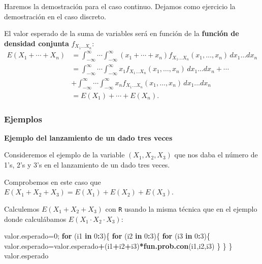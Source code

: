 \documentclass[]{book}
\newenvironment{Shaded}{\begin{snugshade}}{\end{snugshade}}
\newcommand{\ControlFlowTok}[1]{\textcolor[rgb]{0.13,0.29,0.53}{\textbf{#1}}}
\newcommand{\DecValTok}[1]{\textcolor[rgb]{0.00,0.00,0.81}{#1}}
\newcommand{\KeywordTok}[1]{\textcolor[rgb]{0.13,0.29,0.53}{\textbf{#1}}}
\newcommand{\NormalTok}[1]{#1}
\newcommand{\OperatorTok}[1]{\textcolor[rgb]{0.81,0.36,0.00}{\textbf{#1}}}
\begin{document}
Haremos la demostración para el caso continuo. Dejamos como ejercicio la demostración en el caso discreto.

El valor esperado de la suma de variables será en función de la \textbf{función de densidad conjunta} \(f_{X_1\ldots X_n}\):
\[
\begin{array}{rl}
E(X_1+\cdots + X_n) & = \int_{-\infty}^\infty\cdots\int_{-\infty}^\infty (x_1+\cdots + x_n)f_{X_1\ldots X_n}(x_1,\ldots,x_n)\,dx_1\ldots dx_n \\ & = \int_{-\infty}^\infty\cdots\int_{-\infty}^\infty x_1f_{X_1\ldots X_n}(x_1,\ldots,x_n)\,dx_1\ldots dx_n+ \cdots \\ & + \int_{-\infty}^\infty\cdots\int_{-\infty}^\infty x_n f_{X_1\ldots X_n}(x_1,\ldots,x_n)\,dx_1\ldots dx_n \\ & = E(X_1)+\cdots + E(X_n).
\end{array}
\]

\hypertarget{ejemplos-16}{%
\subsubsection{Ejemplos}\label{ejemplos-16}}

\textbf{Ejemplo del lanzamiento de un dado tres veces}

Consideremos el ejemplo de la variable \((X_1,X_2,X_3)\) que nos daba el número de 1's, 2's y 3's en el lanzamiento de un dado tres veces.

Comprobemos en este caso que \(E(X_1+X_2+X_3)=E(X_1)+E(X_2)+E(X_3)\).

Calculemos \(E(X_1+X_2+X_3)\) con \texttt{R} usando la misma técnica que en el ejemplo donde calculábamos \(E(X_1\cdot X_2\cdot X_3)\):

\begin{Shaded}
\begin{Highlighting}[]
\NormalTok{valor.esperado=}\DecValTok{0}\NormalTok{;}
\ControlFlowTok{for}\NormalTok{ (i1 }\ControlFlowTok{in} \DecValTok{0}\OperatorTok{:}\DecValTok{3}\NormalTok{)\{}
  \ControlFlowTok{for}\NormalTok{ (i2 }\ControlFlowTok{in} \DecValTok{0}\OperatorTok{:}\DecValTok{3}\NormalTok{)\{}
    \ControlFlowTok{for}\NormalTok{ (i3 }\ControlFlowTok{in} \DecValTok{0}\OperatorTok{:}\DecValTok{3}\NormalTok{)\{}
\NormalTok{      valor.esperado=valor.esperado}\OperatorTok{+}\NormalTok{(i1}\OperatorTok{+}\NormalTok{i2}\OperatorTok{+}\NormalTok{i3)}\OperatorTok{*}\KeywordTok{fun.prob.con}\NormalTok{(i1,i2,i3)}
\NormalTok{    \}}
\NormalTok{  \}}
\NormalTok{\}}
\NormalTok{valor.esperado}
\end{Highlighting}
\end{Shaded}
\end{document}
